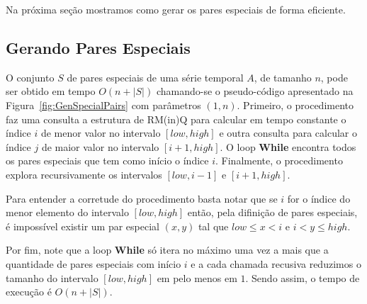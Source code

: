 \documentclass[12pt]{article}
\begin{document}
Na próxima seção mostramos como gerar os pares especiais de forma eficiente.

\subsection{Gerando Pares Especiais}

O conjunto $S$ de pares especiais de uma série temporal $A$, de tamanho $n$, pode ser obtido
em tempo $O(n + |S|)$ chamando-se o pseudo-código apresentado na Figura~\ref{fig:GenSpecialPairs}
com parâmetros $(1, n)$. Primeiro, o procedimento faz uma consulta a estrutura de RM(in)Q para calcular
em tempo constante o índice $i$ de menor valor no intervalo $[low, high]$ e outra consulta
para calcular o índice $j$ de maior valor no intervalo $[i + 1, high]$. 
O loop {\bf While} encontra todos os pares especiais que tem como início o índice $i$.
Finalmente, o procedimento explora recursivamente os intervalos $[low, i - 1]$ e $[i + 1, high]$.

Para entender a corretude do procedimento basta notar que se $i$ for o índice
do menor elemento do intervalo $[low, high]$ então, pela difinição de pares especiais,
é impossível existir um par especial $(x, y)$ tal que $low \le x < i$ e $i < y \le high$.

Por fim, note que a loop {\bf While} só itera no máximo uma vez a mais que a quantidade
de pares especiais com início $i$ e a cada chamada recusiva reduzimos o tamanho do intervalo
$[low, high]$ em pelo menos em $1$. Sendo assim, o tempo de execução é $O(n + |S|)$.
\end{document}
